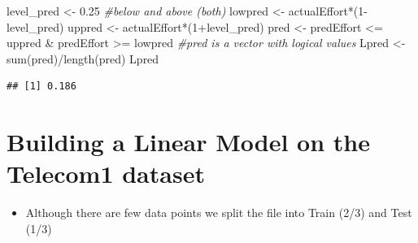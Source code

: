 \documentclass[
]{book}
\newenvironment{Shaded}{\begin{snugshade}}{\end{snugshade}}
\newcommand{\CommentTok}[1]{\textcolor[rgb]{0.56,0.35,0.01}{\textit{#1}}}
\newcommand{\DecValTok}[1]{\textcolor[rgb]{0.00,0.00,0.81}{#1}}
\newcommand{\FloatTok}[1]{\textcolor[rgb]{0.00,0.00,0.81}{#1}}
\newcommand{\FunctionTok}[1]{\textcolor[rgb]{0.00,0.00,0.00}{#1}}
\newcommand{\NormalTok}[1]{#1}
\newcommand{\OtherTok}[1]{\textcolor[rgb]{0.56,0.35,0.01}{#1}}
\newcommand{\SpecialCharTok}[1]{\textcolor[rgb]{0.00,0.00,0.00}{#1}}
\providecommand{\tightlist}{%
  \setlength{\itemsep}{0pt}\setlength{\parskip}{0pt}}
\begin{document}
\begin{Shaded}
\begin{Highlighting}[]
\NormalTok{level\_pred }\OtherTok{\textless{}{-}} \FloatTok{0.25} \CommentTok{\#below and above (both)}
\NormalTok{lowpred }\OtherTok{\textless{}{-}}\NormalTok{ actualEffort}\SpecialCharTok{*}\NormalTok{(}\DecValTok{1}\SpecialCharTok{{-}}\NormalTok{level\_pred)}
\NormalTok{uppred }\OtherTok{\textless{}{-}}\NormalTok{  actualEffort}\SpecialCharTok{*}\NormalTok{(}\DecValTok{1}\SpecialCharTok{+}\NormalTok{level\_pred)}
\NormalTok{pred  }\OtherTok{\textless{}{-}}\NormalTok{  predEffort }\SpecialCharTok{\textless{}=}\NormalTok{ uppred }\SpecialCharTok{\&}\NormalTok{ predEffort }\SpecialCharTok{\textgreater{}=}\NormalTok{ lowpred  }\CommentTok{\#pred is a vector with logical values }
\NormalTok{Lpred }\OtherTok{\textless{}{-}} \FunctionTok{sum}\NormalTok{(pred)}\SpecialCharTok{/}\FunctionTok{length}\NormalTok{(pred)}
\NormalTok{Lpred}
\end{Highlighting}
\end{Shaded}

\begin{verbatim}
## [1] 0.186
\end{verbatim}

\hypertarget{building-a-linear-model-on-the-telecom1-dataset}{%
\section{Building a Linear Model on the Telecom1 dataset}\label{building-a-linear-model-on-the-telecom1-dataset}}

\begin{itemize}
\tightlist
\item
  Although there are few data points we split the file into Train (2/3) and Test (1/3)
\end{itemize}
\end{document}
